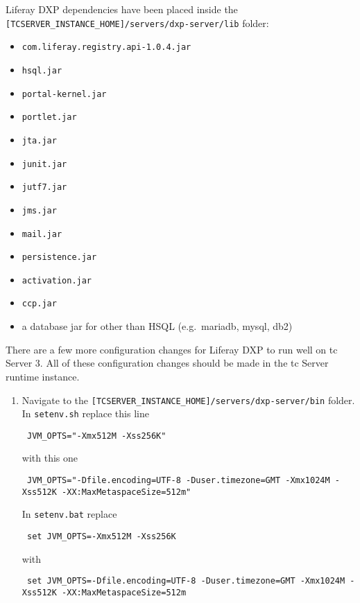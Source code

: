 Liferay DXP dependencies have been placed inside the
\texttt{{[}TCSERVER\_INSTANCE\_HOME{]}/servers/dxp-server/lib} folder:

\begin{itemize}
\tightlist
\item
  \texttt{com.liferay.registry.api-1.0.4.jar}
\item
  \texttt{hsql.jar}
\item
  \texttt{portal-kernel.jar}
\item
  \texttt{portlet.jar}
\item
  \texttt{jta.jar}
\item
  \texttt{junit.jar}
\item
  \texttt{jutf7.jar}
\item
  \texttt{jms.jar}
\item
  \texttt{mail.jar}
\item
  \texttt{persistence.jar}
\item
  \texttt{activation.jar}
\item
  \texttt{ccp.jar}
\item
  a database jar for other than HSQL (e.g.~mariadb, mysql, db2)
\end{itemize}

There are a few more configuration changes for Liferay DXP to run well
on tc Server 3. All of these configuration changes should be made in the
tc Server runtime instance.

\begin{enumerate}
\def\labelenumi{\arabic{enumi}.}
\item
  Navigate to the
  \texttt{{[}TCSERVER\_INSTANCE\_HOME{]}/servers/dxp-server/bin} folder.
  In \texttt{setenv.sh} replace this line

\begin{verbatim}
 JVM_OPTS="-Xmx512M -Xss256K"
\end{verbatim}

  with this one

\begin{verbatim}
 JVM_OPTS="-Dfile.encoding=UTF-8 -Duser.timezone=GMT -Xmx1024M -Xss512K -XX:MaxMetaspaceSize=512m"
\end{verbatim}

  In \texttt{setenv.bat} replace

\begin{verbatim}
 set JVM_OPTS=-Xmx512M -Xss256K
\end{verbatim}

  with

\begin{verbatim}
 set JVM_OPTS=-Dfile.encoding=UTF-8 -Duser.timezone=GMT -Xmx1024M -Xss512K -XX:MaxMetaspaceSize=512m
\end{verbatim}
\end{enumerate}

